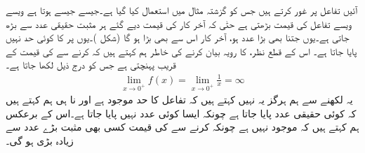 آئیں تفاعل  پر غور کرتے ہیں جس کو گزشتہ مثال میں استعمال کیا گیا ہے۔جیسے جیسے  ہوتا ہے ویسے ویسے تفاعل  کی قیمت بڑھتی ہے حتٰی کہ آخر کار  کی قیمت دیے گئے ہر مثبت حقیقی عدد  سے بڑھ جاتی ہے۔یوں  جتنا بھی بڑا عدد ہو،  آخر کار اس سے بھی بڑا ہو گا (شکل )۔یوں  پر  کا کوئی حد نہیں پایا جاتا ہے۔ اس کے قطع نظر،  کا رویہ بیان کرنے کی خاطر  ہم کہتے ہیں کہ  کرنے سے  کی قیمت  کے قریب پہنچتی ہے جس کو درج ذیل لکھا جاتا ہے۔
\begin{align*}
\lim_{x\to 0^+}f(x)=\lim_{x\to 0^+}\frac{1}{x}=\infty
\end{align*}
یہ لکھنے سے ہم ہرگز یہ نہیں کہتے ہیں کہ تفاعل کا حد موجود ہے اور نا ہی ہم کہتے ہیں کہ کوئی حقیقی عدد  پایا جاتا ہے چونکہ ایسا کوئی عدد نہیں پایا جاتا ہے۔اس کے برعکس ہم کہتے ہیں کہ  موجود نہیں ہے  چونکہ  کرنے سے  کی قیمت کسی بھی مثبت بڑے عدد سے زیادہ بڑی ہو گی۔

